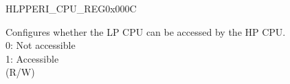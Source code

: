 \begin{register}{H}{LPPERI\_CPU\_REG}{0x000C}\label{regdesc:LPPERICPUREG}
%
%
\regnewline%
\begin{regdesc}\begin{reglist}
\label{fielddesc:LPPERILPCOREDBGMUNAVAILABLE}\item [LPPERI\_LPCORE\_DBGM\_UNAVAILABLE] Configures whether the LP CPU can be accessed by the HP CPU.\\
0: Not accessible\\
1: Accessible\\ (R/W)
\end{reglist}\end{regdesc}
\end{register}


